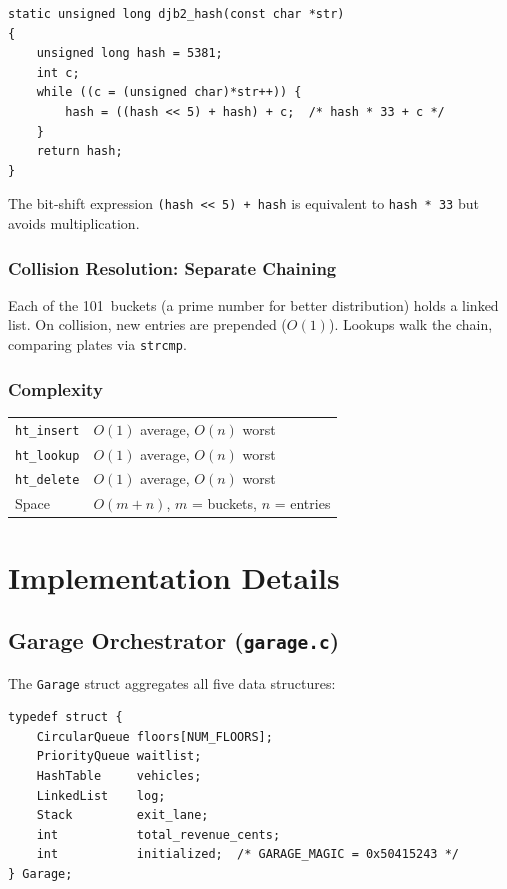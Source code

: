 \documentclass[12pt, a4paper]{report}
\begin{document}
\begin{lstlisting}[style=cstyle, caption={DJB2 hash function}]
static unsigned long djb2_hash(const char *str)
{
    unsigned long hash = 5381;
    int c;
    while ((c = (unsigned char)*str++)) {
        hash = ((hash << 5) + hash) + c;  /* hash * 33 + c */
    }
    return hash;
}
\end{lstlisting}

The bit-shift expression \texttt{(hash << 5) + hash} is equivalent to
\texttt{hash * 33} but avoids multiplication.

\subsection{Collision Resolution: Separate Chaining}

Each of the 101~buckets (a prime number for better distribution) holds a
linked list.  On collision, new entries are prepended ($O(1)$).
Lookups walk the chain, comparing plates via \texttt{strcmp}.

\subsection{Complexity}

\begin{tabular}{ll}
  \texttt{ht\_insert}  & $O(1)$ average, $O(n)$ worst \\
  \texttt{ht\_lookup}  & $O(1)$ average, $O(n)$ worst \\
  \texttt{ht\_delete}  & $O(1)$ average, $O(n)$ worst \\
  Space                 & $O(m + n)$, $m$ = buckets, $n$ = entries \\
\end{tabular}

\chapter{Implementation Details}

\section{Garage Orchestrator (\texttt{garage.c})}

The \texttt{Garage} struct aggregates all five data structures:

\begin{lstlisting}[style=cstyle, caption={Central Garage structure}]
typedef struct {
    CircularQueue floors[NUM_FLOORS];
    PriorityQueue waitlist;
    HashTable     vehicles;
    LinkedList    log;
    Stack         exit_lane;
    int           total_revenue_cents;
    int           initialized;  /* GARAGE_MAGIC = 0x50415243 */
} Garage;
\end{lstlisting}
\end{document}
